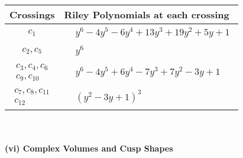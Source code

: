 \documentclass[1p]{elsarticle_modified}
\theoremstyle{definition}
\begin{document}
\begin{tabular}{m{50pt}|m{274pt}}
Crossings & \hspace{64pt}Riley Polynomials at each crossing \\
\hline $$\begin{aligned}c_{1}\end{aligned}$$&$\begin{aligned}
&y^6-4 y^5-6 y^4+13 y^3+19 y^2+5 y+1
\end{aligned}$\\
\hline $$\begin{aligned}c_{2},c_{5}\end{aligned}$$&$\begin{aligned}
&y^6
\end{aligned}$\\
\hline $$\begin{aligned}c_{3},c_{4},c_{6}\\c_{9},c_{10}\end{aligned}$$&$\begin{aligned}
&y^6-4 y^5+6 y^4-7 y^3+7 y^2-3 y+1
\end{aligned}$\\
\hline $$\begin{aligned}c_{7},c_{8},c_{11}\\c_{12}\end{aligned}$$&$\begin{aligned}
&(y^2-3 y+1)^3
\end{aligned}$\\
\hline
\end{tabular}\\~\\
\newpage\flushleft \textbf{(vi) Complex Volumes and Cusp Shapes}
\end{document}
